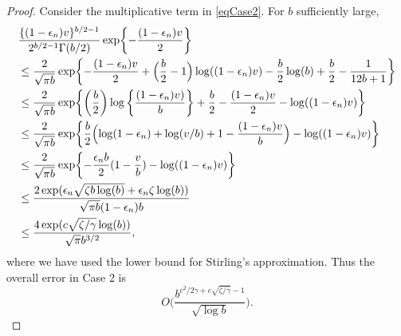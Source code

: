 \documentclass[10pt,a4paper]{amsart}
\begin{document}
\begin{proof}
	Consider the multiplicative term in \eqref{eqCase2}. For $b$ sufficiently large,
	\begin{align*}
		&\frac{\{(1 -\epsilon_n)v\}^{b/2-1}}{2^{b/2 -1}\Gamma(b/2)} \exp\biggl\{ -\frac{ (1 -\epsilon_n)v }{2} \biggr\} \\
		&\leq  \frac{2}{\sqrt{\pi b}} \exp\biggl\{-\frac{(1 - \epsilon_n)v}{2} + \Bigl(\frac{b}{2} - 1\Bigr) \log( (1- \epsilon_n)v ) - \frac{b}{2}\log(b) + \frac{b}{2} - \frac{1}{12b + 1}  \biggr\}\\
		&\leq \frac{2}{\sqrt{\pi b}} \exp\biggl\{\left(\frac{b}{2}\right) \log\left\{ \frac{(1- \epsilon_n)v )}{b} \right\} +  \frac{b}{2} -\frac{(1 - \epsilon_n)v}{2} - \log((1-\epsilon_n)v) \biggr\}\\
		&\leq \frac{2}{\sqrt{\pi b}} \exp\biggl\{ \frac{b}{2}\Bigl( \log(1 - \epsilon_n) + \log(v/b) + 1 - \frac{(1-\epsilon_n)v}{b}\Bigr) - \log( (1- \epsilon_n)v )   \biggr\}\\
		&\leq\frac{2}{\sqrt{\pi b}} \exp\biggl\{ -\frac{\epsilon_n b}{2} (1 - \frac{v}{b}) - \log( (1- \epsilon_n)v )  \biggr\}\\
		&\leq \frac{2\exp(\epsilon_n\sqrt{\zeta b\log(b)} + \epsilon_n\zeta\log(b) )}{\sqrt{\pi b}(1-\epsilon_n)b } \\
		&\leq \frac{4\exp(c\sqrt{\zeta/\gamma}\log(b))}{\sqrt{\pi}b^{3/2}  },
	\end{align*}
	where we have used the lower bound for Stirling's approximation.
	Thus the overall error in Case 2 is
	\[
	O\biggl( \frac{b^{c^2/2\gamma + c\sqrt{\zeta/\gamma} - 1}}{\sqrt{\log b}} \biggr).
	\]
	

\end{proof}
\end{document}

